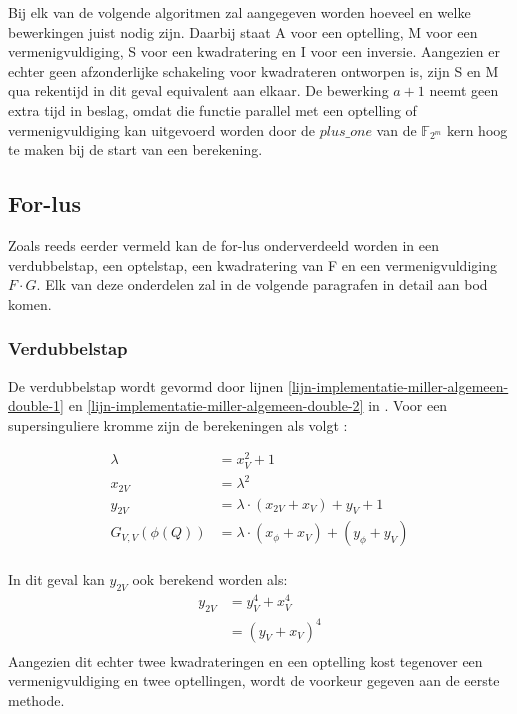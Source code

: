 Bij elk van de volgende algoritmen zal aangegeven worden hoeveel en welke bewerkingen juist nodig zijn. Daarbij staat \textsf{A} voor een optelling, \textsf{M} voor een vermenigvuldiging, \textsf{S} voor een kwadratering en \textsf{I} voor een inversie. Aangezien er echter geen afzonderlijke schakeling voor kwadrateren ontworpen is, zijn \textsf{S} en \textsf{M} qua rekentijd in dit geval equivalent aan elkaar. De bewerking $a + 1$ neemt geen extra tijd in beslag, omdat die functie parallel met een optelling of vermenigvuldiging kan uitgevoerd worden door de $plus\_one$ van de $\mathbb{F}_{2^m}$ kern hoog te maken bij de start van een berekening.

\subsection{For-lus\label{subsectie-implementatie-miller-forlus}}

Zoals reeds eerder vermeld kan de for-lus onderverdeeld worden in een verdubbelstap, een optelstap, een kwadratering van F en een vermenigvuldiging $F \cdot G$. Elk van deze onderdelen zal in de volgende paragrafen in detail aan bod komen.

\subsubsection{Verdubbelstap}

De verdubbelstap wordt gevormd door lijnen \ref{lijn-implementatie-miller-algemeen-double-1} en \ref{lijn-implementatie-miller-algemeen-double-2} in . Voor een supersinguliere kromme zijn de berekeningen als volgt \cite{bertoni, hankerson-book}:

\[\begin{aligned}
	\lambda &= x_V^2 + 1\\
	x_{2V} &= \lambda ^2\\
	y_{2V} &= \lambda \cdot (x_{2V} + x_V) + y_V + 1\\
	G_{V,V}(\phi(Q)) &= \lambda \cdot (x_{\phi} + x_V) + (y_{\phi} + y_V)\\
\end{aligned}\]

In dit geval kan $y_{2V}$ ook berekend worden als:
\[\begin{aligned}
y_{2V}	&= y_V^4 + x_V^4\\
			&= (y_V + x_V)^4\\
\end{aligned}\]
Aangezien dit echter twee kwadrateringen en een optelling kost tegenover een vermenigvuldiging en twee optellingen, wordt de voorkeur gegeven aan de eerste methode.


